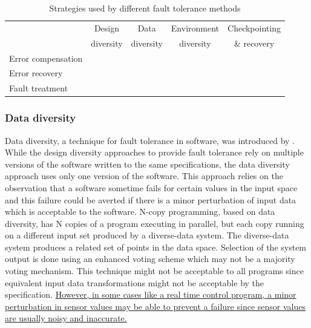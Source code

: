 \documentclass[a4paper, 11pt]{article}
\newcommand{\cmark}{\ding{51}}%
\begin{document}
\begin{table}[h]
\centering
\caption{Strategies used by different fault tolerance methods}
\label{tab:faulttolmethods}
\begin{tabular}{l c c c c }
\toprule
                   & Design    & Data      & Environment & Checkpointing \\
                   & diversity & diversity & diversity   & \& recovery   \\
\midrule
Error compensation & \cmark    & \cmark    &             &               \\
Error recovery     &           &           &             & \cmark        \\
Fault treatment    &           &           & \cmark      &               \\
\bottomrule
\end{tabular}
\end{table}


\subsubsection{Data diversity}
Data diversity, a technique for fault tolerance in software, was introduced by \citet{ammann1988data}. While the design diversity approaches to provide fault tolerance rely on multiple versions of the software written to the same specifications, the data diversity approach uses only one version of the software. This approach relies on the observation that a software sometime fails for certain values in the input space and this failure could be averted if there is a minor perturbation of input data which is acceptable to the software. N-copy programming, based on data diversity, has N copies of a program executing in parallel, but each copy running on a different input set produced by a diverse-data system. The diverse-data system produces a related set of points in the data space. Selection of the system output is done using an enhanced voting scheme which may not be a majority voting mechanism. This technique might not be acceptable to all programs since equivalent input data transformations might not be acceptable by the specification. \ul{However, in some cases like a real time control program, a minor perturbation in sensor values may be able to prevent a failure since sensor values are usually noisy and inaccurate.}
\end{document}
